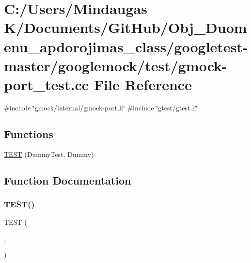 \hypertarget{googletest-master_2googlemock_2test_2gmock-port__test_8cc}{}\section{C\+:/\+Users/\+Mindaugas K/\+Documents/\+Git\+Hub/\+Obj\+\_\+\+Duomenu\+\_\+apdorojimas\+\_\+class/googletest-\/master/googlemock/test/gmock-\/port\+\_\+test.cc File Reference}
\label{googletest-master_2googlemock_2test_2gmock-port__test_8cc}
{\ttfamily \#include \char`\"{}gmock/internal/gmock-\/port.\+h\char`\"{}}\newline
{\ttfamily \#include \char`\"{}gtest/gtest.\+h\char`\"{}}\newline
\subsection*{Functions}
\begin{DoxyCompactItemize}
\item 
\mbox{\hyperlink{googletest-master_2googlemock_2test_2gmock-port__test_8cc_a63812c9ef0cbc6907a251ccf919da78e}{T\+E\+ST}} (Dummy\+Test, Dummy)
\end{DoxyCompactItemize}


\subsection{Function Documentation}
\mbox{\label{googletest-master_2googlemock_2test_2gmock-port__test_8cc_a63812c9ef0cbc6907a251ccf919da78e}} 
\subsubsection{\texorpdfstring{TEST()}{TEST()}}
{\footnotesize\ttfamily T\+E\+ST (\begin{DoxyParamCaption}\item[{Dummy\+Test}]{,  }\item[{Dummy}]{ }\end{DoxyParamCaption})}

